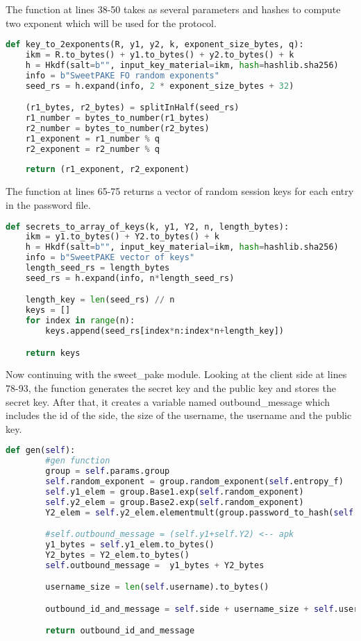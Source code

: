 \documentclass[../main.tex]{subfiles}
\begin{document}
The function at lines 38-50 takes as several parameters and hashes to compute two
exponent which will be used for the protocol.

\begin{lstlisting}[language=Python]
def key_to_2exponents(R, y1, y2, k, exponent_size_bytes, q):
    ikm = R.to_bytes() + y1.to_bytes() + y2.to_bytes() + k
    h = Hkdf(salt=b"", input_key_material=ikm, hash=hashlib.sha256)
    info = b"SweetPAKE FO random exponents"
    seed_rs = h.expand(info, 2 * exponent_size_bytes + 32)

    (r1_bytes, r2_bytes) = splitInHalf(seed_rs)
    r1_number = bytes_to_number(r1_bytes)
    r2_number = bytes_to_number(r2_bytes)
    r1_exponent = r1_number % q
    r2_exponent = r2_number % q
    
    return (r1_exponent, r2_exponent)
\end{lstlisting}

The function at lines 65-75 returns a vector of random session keys for each
entry in the password file.

\begin{lstlisting}[language=Python]
def secrets_to_array_of_keys(k, y1, Y2, n, length_bytes):
    ikm = y1.to_bytes() + Y2.to_bytes() + k
    h = Hkdf(salt=b"", input_key_material=ikm, hash=hashlib.sha256)
    info = b"SweetPAKE vector of keys"
    length_seed_rs = length_bytes
    seed_rs = h.expand(info, n*length_seed_rs)

    length_key = len(seed_rs) // n
    keys = []
    for index in range(n):
        keys.append(seed_rs[index*n:index*n+length_key])

    return keys
\end{lstlisting}

Now continuing with the sweet\_pake module. Looking at the client side at lines 78-93,
the function generates the secret key and the public key and stores the secret
key. After that, it creates a variable named outbound\_message which includes
the id of the side, the size of the username, the username and the public key.

\begin{lstlisting}[language=Python]
    def gen(self):
        #gen function
        group = self.params.group
        self.random_exponent = group.random_exponent(self.entropy_f)
        self.y1_elem = group.Base1.exp(self.random_exponent)
        self.y2_elem = group.Base2.exp(self.random_exponent)
        Y2_elem = self.y2_elem.elementmult(group.password_to_hash(self.pw))

        #self.outbound_message = (self.y1+self.Y2) <-- apk
        y1_bytes = self.y1_elem.to_bytes()
        Y2_bytes = Y2_elem.to_bytes()
        self.outbound_message =  y1_bytes + Y2_bytes

        username_size = len(self.username).to_bytes()

        outbound_id_and_message = self.side + username_size + self.username + self.outbound_message

        return outbound_id_and_message
\end{lstlisting}
\end{document}
